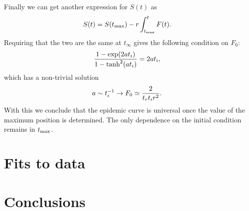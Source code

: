 \documentclass[a4paper,oneside,11pt]{article}
\begin{document}
Finally we can get another expression for $S(t)$ as
\begin{eqnarray}
S(t) = S(t_{\rm max}) - r \int_{t_{\rm max}}^t F(t).
\end{eqnarray}
Requiring that the two are the same at $t_\infty$ gives the following condition on $F_0$:
\begin{eqnarray}
{1-\exp(2 a t_i)\over 1-\tanh^2(a t_i)} = 2 a t_i,
\end{eqnarray}
which has a non-trivial solution
\begin{eqnarray}
a\sim t_i^{-1} \rightarrow F_0 \simeq {2 \over t_r t_i r^2}. 
\end{eqnarray}
With this we conclude that the epidemic curve is universal once the value of the maximum position is determined. 
The only dependence on the initial condition remains in $t_{\rm max}$. 


\section{Fits to data} 
\label{sec:fits}
\section{Conclusions}
\label{sec:conclu}



\end{document}
